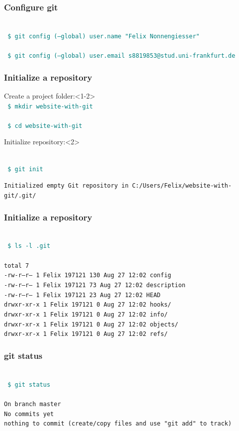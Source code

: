 \documentclass[aspectratio=169]{beamer}
\newcommand{\shellcmd}[1]{~\\ \indent\indent\texttt{\textcolor{teal}{ \$ #1}\\}}
\begin{document}
\begin{frame}
\frametitle{Configure git}

\shellcmd{git config (--global) user.name "Felix Nonnengiesser"}
\shellcmd{git config (--global) user.email s8819853@stud.uni-frankfurt.de}

\end{frame}


\begin{frame}
\frametitle{Initialize a repository}


\begin{block}{Create a project folder:}<1-2>
	\shellcmd{mkdir website-with-git}
	\shellcmd{cd website-with-git}
\end{block}

\begin{block}{Initialize repository:}<2>
	
	\shellcmd{git init}

	\texttt{Initialized empty Git repository in C:/Users/Felix/website-with-git/.git/}
\end{block}


\end{frame}


\begin{frame}
\frametitle{Initialize a repository}
\shellcmd{ls -l .git}
~\\
\texttt{total 7\\
	-rw-r--r-- 1 Felix 197121 130 Aug 27 12:02 config \\
	-rw-r--r-- 1 Felix 197121  73 Aug 27 12:02 description\\
	-rw-r--r-- 1 Felix 197121  23 Aug 27 12:02 HEAD\\
	drwxr-xr-x 1 Felix 197121   0 Aug 27 12:02 hooks/\\
	drwxr-xr-x 1 Felix 197121   0 Aug 27 12:02 info/\\
	drwxr-xr-x 1 Felix 197121   0 Aug 27 12:02 objects/\\
	drwxr-xr-x 1 Felix 197121   0 Aug 27 12:02 refs/\\
}
\end{frame}


\begin{frame}
\frametitle{git status}

\shellcmd{git status}
~\\
\texttt{On branch master\\
No commits yet\\
nothing to commit (create/copy files and use "git add" to track)
}

\end{frame}
\end{document}
